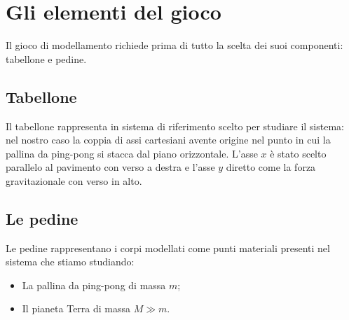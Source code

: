 \documentclass{article}
\begin{document}
\section{Gli elementi del gioco}
Il gioco di modellamento richiede prima di tutto la scelta
dei suoi componenti: tabellone e pedine.

\subsection{Tabellone}
Il tabellone rappresenta in sistema di riferimento scelto per studiare
il sistema: nel nostro caso la coppia di assi cartesiani avente
origine nel punto in cui la pallina da ping-pong si stacca dal
piano orizzontale. L'asse $x$ è stato scelto parallelo al pavimento
con verso a destra e l'asse $y$ diretto come la forza gravitazionale
con verso in alto.

\subsection{Le pedine}
Le pedine rappresentano i corpi modellati come punti materiali
presenti nel sistema che stiamo studiando:

\begin{itemize}
\item La pallina da ping-pong di massa $m$;
\item Il pianeta Terra di massa $M \gg m$.
\end{itemize}

{}

\end{document}
